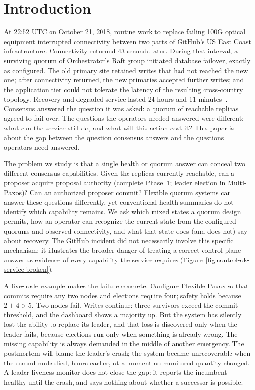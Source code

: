 \documentclass[letterpaper,twocolumn,10pt]{article}
\newcounter{prop}
\newcounter{cor}
\begin{document}
\section{Introduction}

At 22:52 UTC on October 21, 2018, routine work to replace failing 100G optical equipment interrupted connectivity between two parts of GitHub's US East Coast infrastructure. Connectivity returned 43 seconds later. During that interval, a surviving quorum of Orchestrator's Raft group initiated database failover, exactly as configured. The old primary site retained writes that had not reached the new one; after connectivity returned, the new primaries accepted further writes; and the application tier could not tolerate the latency of the resulting cross-country topology. Recovery and degraded service lasted 24 hours and 11 minutes~\cite{warner2018github}. Consensus answered the question it was asked: a quorum of reachable replicas agreed to fail over. The questions the operators needed answered were different: what can the service still do, and what will this action cost it? This paper is about the gap between the question consensus answers and the questions operators need answered.

The problem we study is that a single health or quorum answer can conceal two different consensus capabilities. Given the replicas currently reachable, can a proposer acquire proposal authority (complete Phase~1; leader election in Multi-Paxos)? Can an authorized proposer commit? Flexible quorum systems can answer these questions differently, yet conventional health summaries do not identify which capability remains. We ask which mixed states a quorum design permits, how an operator can recognize the current state from the configured quorums and observed connectivity, and what that state does (and does not) say about recovery. The GitHub incident did not necessarily involve this specific mechanism; it illustrates the broader danger of treating a correct control-plane answer as evidence of every capability the service requires (Figure~\ref{fig:control-ok-service-broken}).

A five-node example makes the failure concrete. Configure Flexible Paxos so that commits require any two nodes and elections require four; safety holds because $2+4>5$. Two nodes fail. Writes continue: three survivors exceed the commit threshold, and the dashboard shows a majority up. But the system has silently lost the ability to replace its leader, and that loss is discovered only when the leader fails, because elections run only when something is already wrong. The missing capability is always demanded in the middle of another emergency. The postmortem will blame the leader's crash; the system became unrecoverable when the second node died, hours earlier, at a moment no monitored quantity changed. A leader-liveness monitor does not close the gap: it reports the incumbent healthy until the crash, and says nothing about whether a successor is possible.
\end{document}
